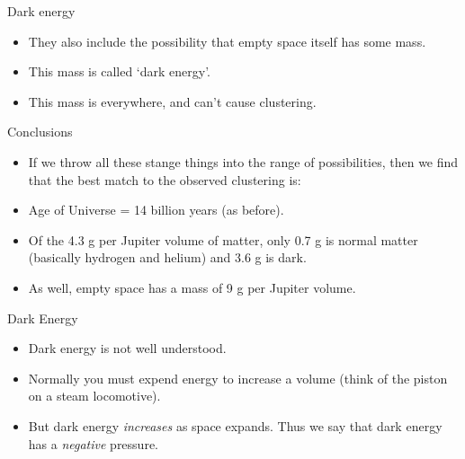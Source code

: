 \documentclass[usenames,dvipsnames]{beamer}
\begin{document}
\begin{frame}{Dark energy}
  \begin{block}{}
    \begin{itemize}
      \item{They also include the possibility that empty space itself has some mass.}
	\item{This mass is called `dark energy'.}
      \item{This mass is everywhere, and can't cause clustering.}
    \end{itemize}
  \end{block}
\end{frame}
      
\begin{frame}{Conclusions}
  \begin{block}{}
    \begin{itemize}
      \item{If we throw all these stange things into the range of possibilities, then we find that the best match to the observed clustering is:}
	\item{Age of Universe = 14 billion years (as before).}
      \item{Of the 4.3 g per Jupiter volume of matter, only 0.7 g is normal matter (basically hydrogen and helium) and 3.6 g is dark.}
      \item{As well, empty space has a mass of 9 g per Jupiter volume.}
    \end{itemize}
  \end{block}
\end{frame}

\begin{frame}{Dark Energy}
  \begin{block}{}
    \begin{itemize}
      \item{Dark energy is not well understood.}
	\item{Normally you must expend energy to increase a volume (think of the piston on a steam locomotive).}
      \item{But dark energy \textit{increases} as space expands. Thus we say that dark energy has a \textit{negative} pressure.}
    \end{itemize}
  \end{block}
\end{frame}
\end{document}
